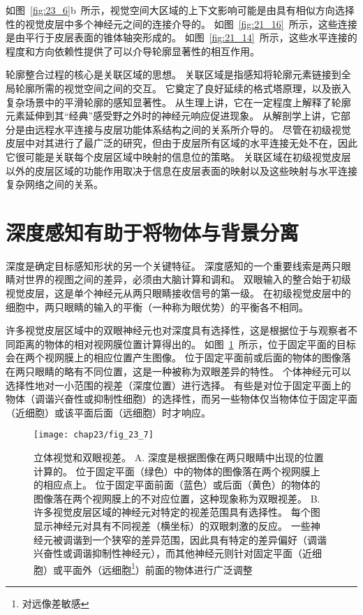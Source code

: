 如图~\ref{fig:23_6}b~所示，视觉空间大区域的上下文影响可能是由具有相似方向选择性的视觉皮层中多个神经元之间的连接介导的。
如图~\ref{fig:21_16}~所示，这些连接是由平行于皮层表面的锥体轴突形成的。
如图~\ref{fig:21_14}~所示，这些水平连接的程度和方向依赖性提供了可以介导轮廓显著性的相互作用。


轮廓整合过程的核心是关联区域的思想。
关联区域是指感知将轮廓元素链接到全局轮廓所需的视觉空间之间的交互。
它奠定了良好延续的格式塔原理，以及嵌入复杂场景中的平滑轮廓的感知显著性。
从生理上讲，它在一定程度上解释了轮廓元素延伸到其“经典”感受野之外时的神经元响应促进现象。
从解剖学上讲，它部分是由远程水平连接与皮层功能体系结构之间的关系所介导的。
尽管在初级视觉皮层中对其进行了最广泛的研究，但由于皮层所有区域的水平连接无处不在，因此它很可能是关联每个皮层区域中映射的信息位的策略。
关联区域在初级视觉皮层以外的皮层区域的功能作用取决于信息在皮层表面的映射以及这些映射与水平连接复杂网络之间的关系。



\section{深度感知有助于将物体与背景分离}

深度是确定目标感知形状的另一个关键特征。
深度感知的一个重要线索是两只眼睛对世界的视图之间的差异，必须由大脑计算和调和。
双眼输入的整合始于初级视觉皮层，这是单个神经元从两只眼睛接收信号的第一级。
在初级视觉皮层中的细胞中，两只眼睛的输入的平衡（一种称为眼优势）的平衡各不相同。


许多视觉皮层区域中的双眼神经元也对深度具有选择性，这是根据位于与观察者不同距离的物体的相对视网膜位置计算得出的。
如图~\ref{fig:23_7}~所示，位于固定平面的目标会在两个视网膜上的相应位置产生图像。
位于固定平面前或后面的物体的图像落在两只眼睛的略有不同位置，这是一种被称为双眼差异的特性。
个体神经元可以选择性地对一小范围的视差（深度位置）进行选择。
有些是对位于固定平面上的物体（调谐兴奋性或抑制性细胞）的选择性，而另一些物体仅当物体位于固定平面（近细胞）或该平面后面（远细胞）时才响应。


\begin{figure}[htbp]
	\centering
	\texttt{[image: chap23/fig\_23\_7]}
	\caption{立体视觉和双眼视差。
		A. 深度是根据图像在两只眼睛中出现的位置计算的。
		位于固定平面（绿色）中的物体的图像落在两个视网膜上的相应点上。
		位于固定平面前面（蓝色）或后面（黄色）的物体的图像落在两个视网膜上的不对应位置，这种现象称为双眼视差。
		B. 许多视觉皮层区域的神经元对特定的视差范围具有选择性。
		每个图显示神经元对具有不同视差（横坐标）的双眼刺激的反应。
		一些神经元被调谐到一个狭窄的差异范围，因此具有特定的差异偏好（调谐兴奋性或调谐抑制性神经元），而其他神经元则针对固定平面（近细胞）或平面外（远细胞\footnote{对远像差敏感}）前面的物体进行广泛调整\cite{poggio1995mechanisms}}
	\label{fig:23_7}
\end{figure}



